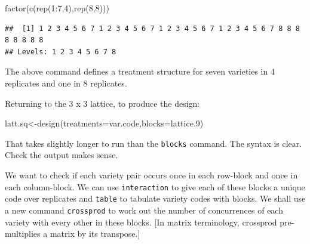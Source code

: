 \documentclass[
]{book}
\newenvironment{Shaded}{\begin{snugshade}}{\end{snugshade}}
\newcommand{\AttributeTok}[1]{\textcolor[rgb]{0.77,0.63,0.00}{#1}}
\newcommand{\DecValTok}[1]{\textcolor[rgb]{0.00,0.00,0.81}{#1}}
\newcommand{\FloatTok}[1]{\textcolor[rgb]{0.00,0.00,0.81}{#1}}
\newcommand{\FunctionTok}[1]{\textcolor[rgb]{0.00,0.00,0.00}{#1}}
\newcommand{\NormalTok}[1]{#1}
\newcommand{\OtherTok}[1]{\textcolor[rgb]{0.56,0.35,0.01}{#1}}
\newcommand{\SpecialCharTok}[1]{\textcolor[rgb]{0.00,0.00,0.00}{#1}}
\begin{document}
\begin{Shaded}
\begin{Highlighting}[]
\FunctionTok{factor}\NormalTok{(}\FunctionTok{c}\NormalTok{(}\FunctionTok{rep}\NormalTok{(}\DecValTok{1}\SpecialCharTok{:}\DecValTok{7}\NormalTok{,}\DecValTok{4}\NormalTok{),}\FunctionTok{rep}\NormalTok{(}\DecValTok{8}\NormalTok{,}\DecValTok{8}\NormalTok{)))}
\end{Highlighting}
\end{Shaded}

\begin{verbatim}
##  [1] 1 2 3 4 5 6 7 1 2 3 4 5 6 7 1 2 3 4 5 6 7 1 2 3 4 5 6 7 8 8 8 8 8 8 8 8
## Levels: 1 2 3 4 5 6 7 8
\end{verbatim}

The above command defines a treatment structure for seven varieties in 4 replicates and one in 8 replicates.

Returning to the 3 x 3 lattice, to produce the design:

\begin{Shaded}
\begin{Highlighting}[]
\NormalTok{latt.sq}\OtherTok{\textless{}{-}}\FunctionTok{design}\NormalTok{(}\AttributeTok{treatments=}\NormalTok{var.code,}\AttributeTok{blocks=}\NormalTok{lattice}\FloatTok{.9}\NormalTok{)}
\end{Highlighting}
\end{Shaded}

That takes slightly longer to run than the \texttt{blocks} command. The syntax is clear. Check the output makes sense.

We want to check if each variety pair occurs once in each row-block and once in each column-block. We can use \texttt{interaction} to give each of these blocks a unique code over replicates and \texttt{table} to tabulate variety codes with blocks. We shall use a new command \texttt{crossprod} to work out the number of concurrences of each variety with every other in these blocks. {[}In matrix terminology, crossprod pre-multiplies a matrix by its transpose.{]}

\begin{Shaded}
\end{Shaded}
\end{document}
